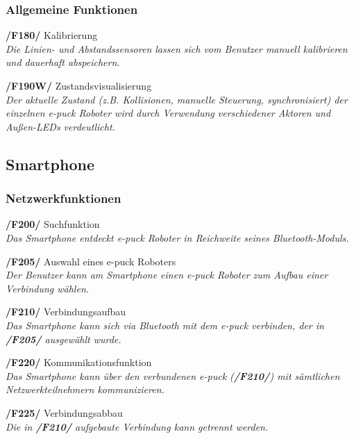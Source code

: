 \documentclass[10pt,a4paper]{article}
\begin{document}
		\subsubsection{Allgemeine Funktionen}
			\begin{list}{}{\leftmargin=1cm}
				\item[\textbf{/F180/}] Kalibrierung
					\\ \textsl{Die Linien- und Abstandssensoren lassen sich vom Benutzer manuell kalibrieren und dauerhaft abspeichern.}					
				\item[\textbf{/F190W/}] Zustandsvisualisierung		
					\\ \textsl{Der aktuelle Zustand (z.B. Kollisionen, manuelle Steuerung, synchronisiert) der einzelnen e-puck Roboter wird
						durch Verwendung verschiedener Aktoren und Außen-LEDs verdeutlicht.}		
			\end{list}
		\subsection{Smartphone}
			\subsubsection{Netzwerkfunktionen}
				\begin{list}{}{\leftmargin=1cm}
					\item[\textbf{/F200/}] Suchfunktion
						\\ \textsl{Das Smartphone entdeckt e-puck Roboter in Reichweite seines Bluetooth-Moduls.}
					\item[\textbf{/F205/}] Auswahl eines e-puck Roboters
						\\ \textsl{Der Benutzer kann am  Smartphone einen e-puck Roboter zum Aufbau einer Verbindung wählen.}						
					\item[\textbf{/F210/}] Verbindungsaufbau
						\\ \textsl{Das Smartphone kann sich via Bluetooth mit dem e-puck verbinden, der in \textbf{/F205/} ausgewählt
							wurde.}	
					\item[\textbf{/F220/}] Kommunikationsfunktion
						\\ \textsl{Das Smartphone kann über den verbundenen e-puck (\textbf{/F210/}) mit sämtlichen
							Netzwerkteilnehmern kommunizieren.}						
					\item[\textbf{/F225/}] Verbindungsabbau
						\\ \textsl{Die in \textbf{/F210/} aufgebaute Verbindung kann getrennt werden.}										
				\end{list}	
\end{document}
